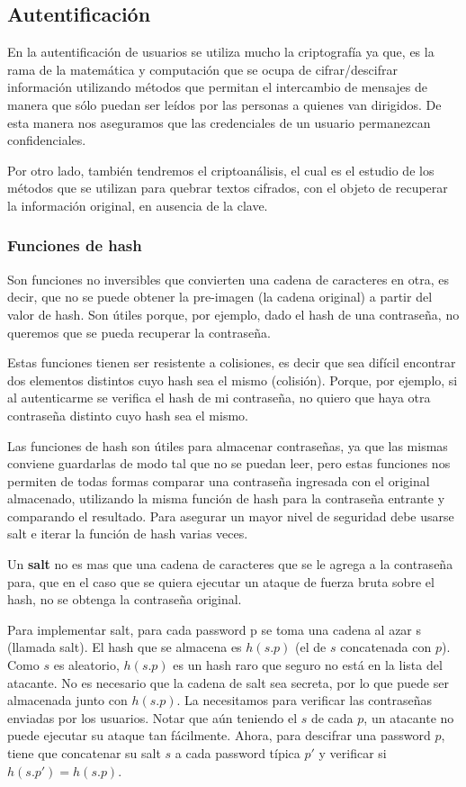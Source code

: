 \documentclass{article}
\begin{document}
\subsection{Autentificación}

En la autentificación de usuarios se utiliza mucho la criptografía ya que, es la rama de la matemática y computación que se ocupa de cifrar/descifrar información utilizando métodos que permitan el intercambio de mensajes de manera que sólo puedan ser leídos por las personas a quienes van dirigidos. De esta manera nos aseguramos que las credenciales de un usuario permanezcan confidenciales.

Por otro lado, también tendremos el criptoanálisis, el cual es el estudio de los métodos que se utilizan para quebrar textos cifrados, con el objeto de recuperar la información original, en ausencia de la clave.

\subsubsection{Funciones de hash}

Son funciones no inversibles que convierten una cadena de caracteres en otra, es decir, que no se puede obtener la pre-imagen (la cadena original) a partir del valor de hash. Son útiles porque, por ejemplo, dado el hash de una contraseña, no queremos que se pueda recuperar la contraseña.

Estas funciones tienen ser resistente a colisiones, es decir que sea difícil encontrar dos elementos distintos cuyo hash sea el mismo (colisión). Porque, por ejemplo, si al autenticarme se verifica el hash de mi contraseña, no quiero que haya otra contraseña distinto cuyo hash sea el mismo.

Las funciones de hash son útiles para almacenar contraseñas, ya que las mismas conviene  guardarlas de modo tal que no se puedan leer, pero estas funciones nos permiten de todas formas comparar una contraseña ingresada con el original almacenado, utilizando la misma función de hash para la contraseña entrante y comparando el resultado. Para asegurar un mayor nivel de seguridad debe usarse salt e iterar la función de hash varias veces. 

Un \textbf{salt} no es mas que una cadena de caracteres que se le agrega a la contraseña para, que en el caso que se quiera ejecutar un ataque de fuerza bruta sobre el hash, no se obtenga la contraseña original. 

Para implementar salt, para cada password p se toma una cadena al azar s (llamada salt). El hash que se almacena es $h(s.p)$ (el de $s$ concatenada con $p$). Como $s$ es aleatorio, $h(s.p)$ es un hash raro que seguro no está en la lista del atacante. No es necesario que la cadena de salt sea secreta, por lo que puede ser almacenada junto con $h(s.p)$. La necesitamos para verificar las contraseñas enviadas por los usuarios. Notar que aún teniendo el $s$ de cada $p$, un atacante no puede ejecutar su ataque tan fácilmente. Ahora, para descifrar una password $p$, tiene que concatenar su salt $s$ a cada password típica $p'$ y verificar si $h(s.p') = h(s.p)$.
\end{document}
